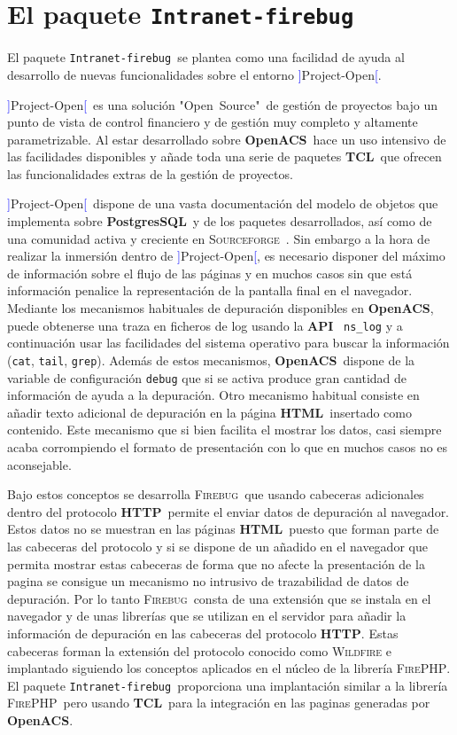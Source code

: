 \documentclass{tufte-handout}
\newcommand{\ifb}{\texttt{Intranet-firebug}}%
\newcommand{\Firebug}{\textsc{Firebug}}%
\newcommand{\FirePHP}{\textsc{FirePHP}}%
\newcommand{\Sourceforge}{\textsc{Sourceforge}}%
\newcommand{\TCL}{\textbf{TCL}}%
\newcommand{\PostgresSQL}{\textbf{PostgresSQL}}%
\newcommand{\OpenACS}{\textbf{OpenACS}}%
\newcommand{\HTML}{\textbf{HTML}}%
\newcommand{\API}{\textbf{API}}%
\newcommand{\api}[1]{\texttt{#1}}%
\newcommand{\HTTP}{\textbf{HTTP}}%
\newcommand{\Wildfire}{\textsc{Wildfire}}%
\newcommand{\po}{{\sf \textcolor{blue}{]}Project-Open\textcolor{blue}{[}}}%
\newcommand{\opsrc}{"Open~Source"} %
\begin{document}
\section{El paquete \ifb\ }

El paquete \ifb\ se plantea como una facilidad de ayuda al desarrollo de nuevas funcionalidades sobre el entorno \po{}. 

\po\ es una solución \opsrc\ de gestión de proyectos bajo un punto de vista de control financiero y de gestión muy completo y altamente parametrizable. Al estar desarrollado sobre \OpenACS\ hace un uso intensivo de las facilidades disponibles y añade toda una serie de paquetes \TCL\ que ofrecen las funcionalidades extras de la gestión de proyectos.

 \po\ dispone de una vasta documentación del modelo de objetos que implementa sobre \PostgresSQL\ y de los paquetes desarrollados, así como de una comunidad activa y creciente en \Sourceforge\ . Sin embargo a la hora de realizar la inmersión dentro de \po, es necesario disponer del máximo de información sobre el flujo de las páginas y en muchos casos sin que está información penalice la representación de la pantalla final en el navegador.
Mediante los mecanismos habituales de depuración disponibles en \OpenACS, puede obtenerse una traza en ficheros de log usando la \API\  \api{ns\_log} y a continuación usar las facilidades del sistema operativo para buscar la información (\api{cat}, \api{tail}, \api{grep}).  Además de estos mecanismos, \OpenACS\ dispone de la variable de configuración \api{debug} que si se activa produce gran cantidad de información de ayuda a la depuración.
Otro mecanismo habitual consiste en añadir texto adicional de depuración en la página \HTML\ insertado como contenido. Este mecanismo que si bien facilita el mostrar los datos, casi siempre acaba corrompiendo el formato de presentación con lo que en muchos casos no es aconsejable.

Bajo estos conceptos se desarrolla \Firebug\ que usando cabeceras adicionales dentro del protocolo \HTTP\ permite el enviar datos de depuración al navegador. Estos datos no se muestran en las páginas  \HTML\ puesto que forman parte de las cabeceras del protocolo y si se dispone de un añadido en el navegador que permita mostrar estas cabeceras de forma que no afecte la presentación de la pagina se consigue un mecanismo no intrusivo de trazabilidad de datos de depuración. Por lo tanto \Firebug\ consta de una extensión que se instala en el navegador y de unas librerías que se utilizan en el servidor para añadir la información de depuración en las cabeceras del protocolo \HTTP. Estas cabeceras forman la extensión del protocolo conocido como \Wildfire{} e implantado siguiendo los conceptos aplicados en el núcleo de la librería \FirePHP.
El paquete \ifb\ proporciona una implantación similar a la librería \FirePHP\ pero usando \TCL\ para la integración en las paginas generadas por \OpenACS.
\end{document}
